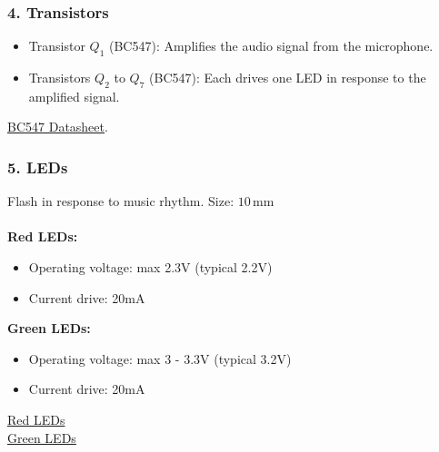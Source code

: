 \documentclass[a4paper]{article}
\numberwithin{figure}{section}
\begin{document}
\subsubsection*{\textbf{4. Transistors}}
\begin{itemize}
    \item Transistor $Q_1$ (BC547): Amplifies the audio signal from the microphone.
    \item Transistors $Q_2$ to $Q_7$ (BC547): Each drives one LED in response to the amplified signal.

\end{itemize}
\href{https://www.alldatasheet.com/datasheet-pdf/view/2894/MOTOROLA/BC547B.html}{BC547 Datasheet}.

\subsubsection*{5. LEDs }
Flash in response to music rhythm. Size: $10 \, \mathrm{mm}$\\
\\
\textbf{Red LEDs:}
\begin{itemize}
\item Operating voltage: max 2.3V (typical 2.2V)
\item Current drive: 20mA
\end{itemize}
\textbf{Green LEDs:}
\begin{itemize}
\item Operating voltage: max 3 - 3.3V (typical 3.2V)
\item Current drive: 20mA
\end{itemize}
\href{https://dientunhattung.com/san-pham/led-trong-10mm-mau-do-chan-dai-led-sieu-sang/}{Red LEDs}\\
\href{https://dientunhattung.com/san-pham/led-trong-10mm-mau-xanh-la-chan-dai-led-sieu-sang/}{Green LEDs}
\end{document}
